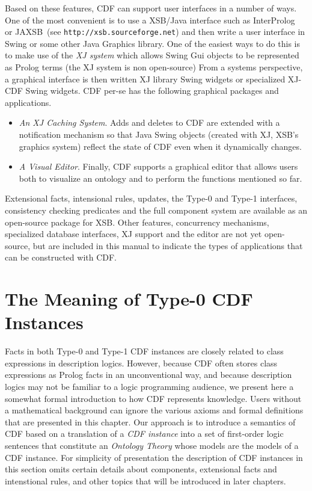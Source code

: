 Based on these features, CDF can support user interfaces in a number
of ways.  One of the most convenient is to use a XSB/Java interface
such as InterProlog~\cite{Cale01} or JAXSB~(see
\texttt{http://xsb.sourceforge.net}) and then write a user interface in
Swing or some other Java Graphics library.  One of the easiest ways to
do this is to make use of the {\em XJ system} which allows Swing Gui
objects to be represented as Prolog terms (the XJ system is non
open-source) From a systems perspective, a graphical interface is then
written XJ library Swing widgets or specialized XJ-CDF Swing widgets.
CDF per-se has the following graphical packages and applications.
%
\begin{itemize}
%
\item {\em An XJ Caching System}. Adds and deletes to CDF are extended
with a notification mechanism so that Java Swing objects (created with
XJ, XSB's graphics system) reflect the state of CDF even when it
dynamically changes.
%
\item {\em A Visual Editor}. Finally,  CDF supports a graphical editor
that allows users both to visualize an ontology and to perform the
functions mentioned so far.
\end{itemize}
%
Extensional facts, intensional rules, updates, the Type-0 and Type-1
interfaces, consistency checking predicates and the full component
system are available as an open-source package for XSB.  Other
features, concurrency mechanisms, specialized database interfaces, XJ
support and the editor are not yet open-source, but are included in
this manual to indicate the types of applications that can be
constructed with CDF.

\section{The Meaning of Type-0 CDF Instances} \label{sec:type0} 

Facts in both Type-0 and Type-1 CDF instances are closely related to
class expressions in description logics.  However, because CDF often
stores class expressions as Prolog facts in an unconventional way, and
because description logics may not be familiar to a logic programming
audience, we present here a somewhat formal introduction to how CDF
represents knowledge.  Users without a mathematical background can
ignore the various axioms and formal definitions that are presented in
this chapter.  Our approach is to introduce a semantics of CDF based
on a translation of a {\em CDF instance} into a set of first-order
logic sentences that constitute an {\em Ontology Theory} whose models
are the models of a CDF instance.  For simplicity of presentation the
description of CDF instances in this section omits certain details
about components, extensional facts and intenstional rules, and other
topics that will be introduced in later chapters.

